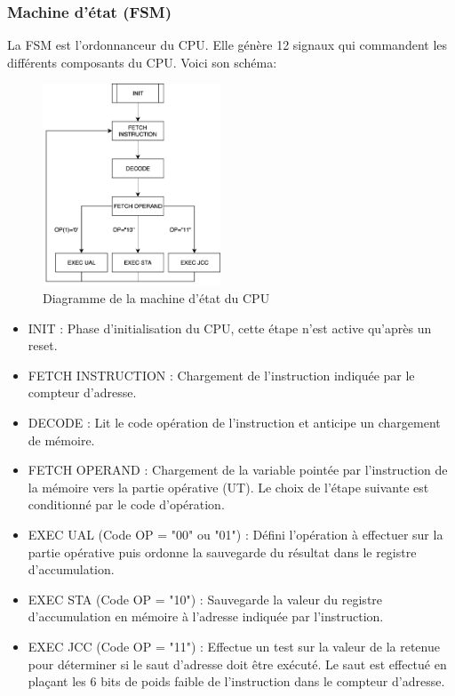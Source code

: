\documentclass{article}
\begin{document}
    \subsubsection{Machine d'état (FSM)}
    \par La FSM est l'ordonnanceur du CPU. Elle génère 12 signaux qui commandent les différents composants du CPU. Voici son schéma: 
    \begin{figure}[h]
        \centering
        \includegraphics[width=200px]{../doc/FSMDiagram.png}
        \caption{Diagramme de la machine d'état du CPU}
        \label{fig:fsm_diagram}
    \end{figure}
    \begin{itemize}\renewcommand{\labelitemi}{$\bullet$} 
        \item INIT : Phase d'initialisation du CPU, cette étape n'est active qu'après un reset. 
        \item FETCH INSTRUCTION : Chargement de l'instruction indiquée par le compteur d'adresse.
        \item DECODE : Lit le code opération de l'instruction et anticipe un chargement de mémoire.
        \item FETCH OPERAND : Chargement de la variable pointée par l'instruction de la mémoire vers la partie opérative (UT). Le choix de l'étape suivante est conditionné par le code d'opération.
        \item EXEC UAL (Code OP = "00" ou "01") : Défini l'opération à effectuer sur la partie opérative puis ordonne la sauvegarde du résultat dans le registre d'accumulation. 
        \item EXEC STA (Code OP = "10") : Sauvegarde la valeur du registre d'accumulation en mémoire à l'adresse indiquée par l'instruction.
        \item EXEC JCC (Code OP = "11") : Effectue un test sur la valeur de la retenue pour déterminer si le saut d'adresse doit être exécuté. Le saut est effectué en plaçant les 6 bits de poids faible de l'instruction dans le compteur d'adresse.
    \end{itemize}
\end{document}
